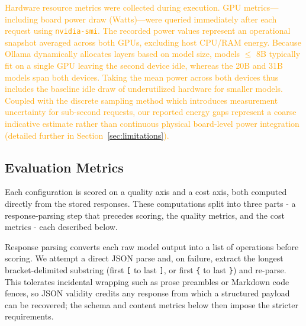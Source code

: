 \documentclass[journal,article,submit,pdftex,moreauthors]{Definitions/mdpi}
\begin{document}
\textcolor{orange}{Hardware resource metrics were collected during execution. GPU metrics—including board power draw (Watts)—were queried immediately after each request using \texttt{nvidia-smi}. The recorded power values represent an operational snapshot averaged across both GPUs, excluding host CPU/RAM energy. Because Ollama dynamically allocates layers based on model size, models $\le$ 8B typically fit on a single GPU leaving the second device idle, whereas the 20B and 31B models span both devices. Taking the mean power across both devices thus includes the baseline idle draw of underutilized hardware for smaller models. Coupled with the discrete sampling method which introduces measurement uncertainty for sub-second requests, our reported energy gaps represent a coarse indicative estimate rather than continuous physical board-level power integration (detailed further in Section~\ref{sec:limitations}).}

\subsection{Evaluation Metrics}\label{sec:metrics}

Each configuration is scored on a quality axis and a cost axis, both computed directly from the stored responses. These computations split into three parts - a response-parsing step that precedes scoring, the quality metrics, and the cost metrics - each described below.

Response parsing converts each raw model output into a list of operations before scoring. We attempt a direct JSON parse and, on failure, extract the longest bracket-delimited substring (first \texttt{[} to last \texttt{]}, or first \texttt{\{} to last \texttt{\}}) and re-parse. This tolerates incidental wrapping such as prose preambles or Markdown code fences, so JSON validity credits any response from which a structured payload can be recovered; the schema and content metrics below then impose the stricter requirements.
\end{document}
